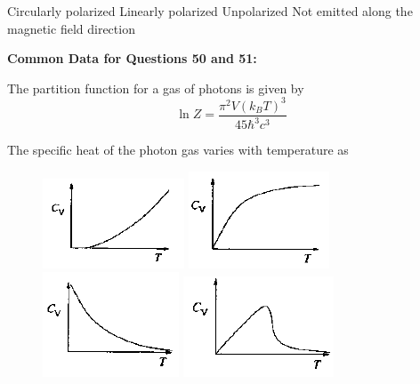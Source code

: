 \documentclass{exam}
\begin{document}
\begin{questions}
\begin{choices}
	\begin{multicols}{2}
	 \choice Circularly polarized \choice Linearly polarized \choice Unpolarized \choice Not emitted along the magnetic field direction
	\end{multicols}
\end{choices}

\textbf{Common Data for Questions 50 and 51:}
\par\noindent The partition function for a gas of photons is given by
\[ \ln Z = \frac{\pi^2 V(k_B T)^3}{45 \hbar^3 c^3} \]

\question The specific heat of the photon gas varies with temperature as\hfill{}
\begin{figure}[H]
	\centering
	\caption*{} \label{50a} \includegraphics[width=0.35\columnwidth]{pics/50a.png}
	\caption*{} \label{50b} \includegraphics[width=0.35\columnwidth]{pics/50b.png}
	\caption*{} \label{50c} \includegraphics[width=0.35\columnwidth]{pics/50c.png}
	\caption*{} \label{50d} \includegraphics[width=0.35\columnwidth]{pics/50d.png}
\end{figure}


\end{questions}
\end{document}
